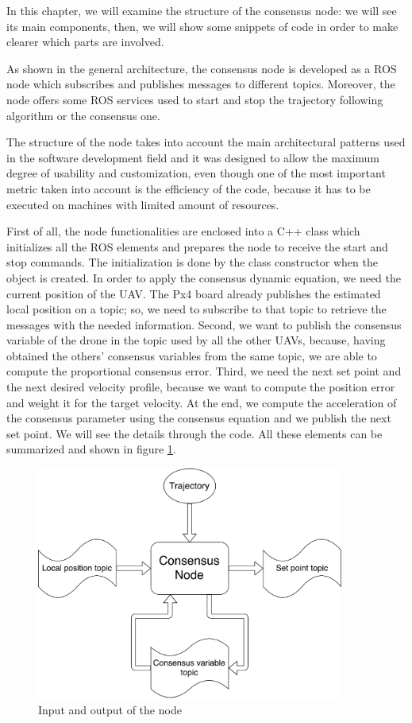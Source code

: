 In this chapter, we will examine the structure of the consensus node: we will see
its main components, then, we will show some snippets of code
in order to make clearer which parts are involved.

As shown in the general architecture, %
the consensus node is developed as a ROS node which subscribes and publishes messages
to different topics.
Moreover, the node offers some ROS services used to start and stop the trajectory
following algorithm or the consensus one.

The structure of the node takes into account the main architectural patterns used
in the software development field and it was designed to allow the maximum degree
of usability and customization, even though one of the most important metric taken
into account is the efficiency of the code, because it has to be executed on
machines with limited amount of resources.

First of all, the node functionalities are enclosed into a C++ class which initializes
all the ROS elements and prepares the node to receive the start and stop commands.
The initialization is done by the class constructor when the object is created.
In order to apply the consensus dynamic equation, we need
the current position of the UAV. The Px4 board already publishes the estimated
local position on a topic; %
so, we need to subscribe to that topic to retrieve the messages with the needed
information.
Second, we want to publish the consensus variable of the drone in the topic used
by all the other UAVs, because, having obtained the others' consensus variables
from the same topic, we are able to compute the proportional consensus error.
Third, we need the next set point and the next desired velocity profile,
because we want to compute the position error and weight it for the target velocity. %
At the end, we compute the acceleration of the consensus parameter using the consensus equation %
and we publish the next set point. We will see the details through the code.
All these elements can be summarized and shown in figure \ref{fig:node_in_out}.

\begin{figure}[h]
\centering
\includegraphics[width=0.9\textwidth]{chapters/chapter-04/figures/consensus_node_structure.pdf}
\caption{Input and output of the node}
\label{fig:node_in_out}
\end{figure}

